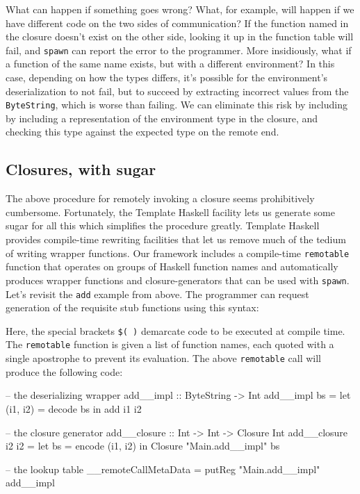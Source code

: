 \documentclass[preprint]{sigplanconf}
\begin{document}
What can happen if something goes wrong? What, for example, will happen if we have different code on the two sides of communication? If the function named in the closure doesn't exist on the other side, looking it up in the function table will fail, and \texttt{spawn} can report the error to the programmer. More insidiously, what if a function of the same name exists, but with a different environment? In this case, depending on how the types differs, it's possible for the environment's deserialization to not fail, but to succeed by extracting incorrect values from the \texttt{ByteString}, which is worse than failing. We can eliminate this risk by including by including a representation of the environment type in the closure, and checking this type against the expected type on the remote end.


\subsection{Closures, with sugar}

The above procedure for remotely invoking a closure seems prohibitively cumbersome. Fortunately, the Template Haskell facility lets us generate some sugar for all this which simplifies the procedure greatly. Template Haskell provides compile-time rewriting facilities that let us remove much of the tedium of writing wrapper functions. Our framework includes a compile-time \texttt{remotable} function that operates on groups of Haskell function names and automatically produces wrapper functions and closure-generators that can be used with \texttt{spawn}. Let's revisit the \texttt{add} example from above. The programmer can request generation of the requisite stub functions using this syntax:


Here, the special brackets \texttt{\$( )} demarcate code to be executed at compile time. The \texttt{remotable} function is given a list of function names, each quoted with a single apostrophe to prevent its evaluation. The above \texttt{remotable} call will produce the following code:

\begin{code}
-- the deserializing wrapper
add__impl :: ByteString -> Int
add__impl bs = let (i1, i2) = decode bs
                in add i1 i2

-- the closure generator
add__closure :: Int -> Int -> Closure Int
add__closure i2 i2 = let bs = encode (i1, i2)
                      in Closure "Main.add__impl" bs

-- the lookup table
__remoteCallMetaData = putReg "Main.add__impl" add__impl
\end{code}
\end{document}
